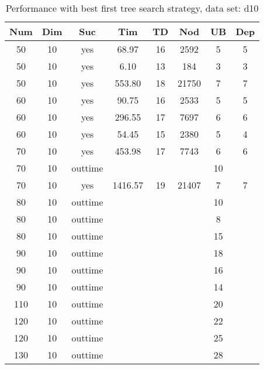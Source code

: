\begin{table}[!htb]
  \centering
  \begin{tabular}[center]{|c|c|c|c|c|c|c|c|}
    \hline
    Num & Dim & Suc & Tim & TD & Nod & UB & Dep \\
    \hline
    50 & 10 & yes & 68.97 & 16 & 2592 & 5 & 5 \\
    50 & 10 & yes & 6.10 & 13 & 184 & 3 & 3 \\
    50 & 10 & yes & 553.80 & 18 & 21750 & 7 & 7 \\
    60 & 10 & yes & 90.75 & 16 & 2533 & 5 & 5 \\
    60 & 10 & yes & 296.55 & 17 & 7697 & 6 & 6 \\
    60 & 10 & yes & 54.45 & 15 & 2380 & 5 & 4 \\
    70 & 10 & yes & 453.98 & 17 & 7743 & 6 & 6 \\
    70 & 10 & outtime &&&& 10 &\\
    70 & 10 & yes & 1416.57 & 19 & 21407 & 7 & 7 \\
    80 & 10 & outtime &&&& 10 &\\
    80 & 10 & outtime &&&& 8 &\\
    80 & 10 & outtime &&&& 15 &\\
    90 & 10 & outtime &&&& 18 &\\
    90 & 10 & outtime &  &  &  & 16 &  \\
    90 & 10 & outtime &&&& 14 &\\
    110 & 10 & outtime &&&& 20 &\\
    120 & 10 & outtime &&&& 22 &\\
    120 & 10 & outtime &&&& 25 &\\
    130 & 10 & outtime &&&& 28 &\\
    \hline
  \end{tabular}
  \caption{Performance with best first tree search strategy, data set: d10}
  \label{tab:test.sel-d10}
\end{table}

